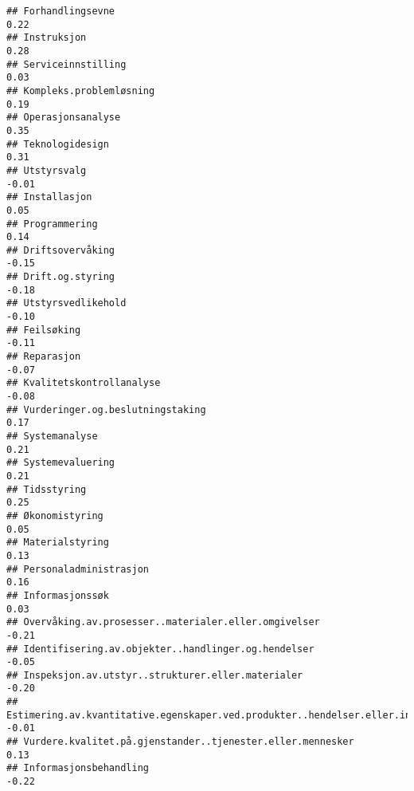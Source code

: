 \documentclass[
]{article}
\begin{document}
\begin{verbatim}
## Forhandlingsevne                                                                  0.22
## Instruksjon                                                                       0.28
## Serviceinnstilling                                                                0.03
## Kompleks.problemløsning                                                           0.19
## Operasjonsanalyse                                                                 0.35
## Teknologidesign                                                                   0.31
## Utstyrsvalg                                                                      -0.01
## Installasjon                                                                      0.05
## Programmering                                                                     0.14
## Driftsovervåking                                                                 -0.15
## Drift.og.styring                                                                 -0.18
## Utstyrsvedlikehold                                                               -0.10
## Feilsøking                                                                       -0.11
## Reparasjon                                                                       -0.07
## Kvalitetskontrollanalyse                                                         -0.08
## Vurderinger.og.beslutningstaking                                                  0.17
## Systemanalyse                                                                     0.21
## Systemevaluering                                                                  0.21
## Tidsstyring                                                                       0.25
## Økonomistyring                                                                    0.05
## Materialstyring                                                                   0.13
## Personaladministrasjon                                                            0.16
## Informasjonssøk                                                                   0.03
## Overvåking.av.prosesser..materialer.eller.omgivelser                             -0.21
## Identifisering.av.objekter..handlinger.og.hendelser                              -0.05
## Inspeksjon.av.utstyr..strukturer.eller.materialer                                -0.20
## Estimering.av.kvantitative.egenskaper.ved.produkter..hendelser.eller.informasjon -0.01
## Vurdere.kvalitet.på.gjenstander..tjenester.eller.mennesker                        0.13
## Informasjonsbehandling                                                           -0.22

\end{verbatim}
\end{document}
